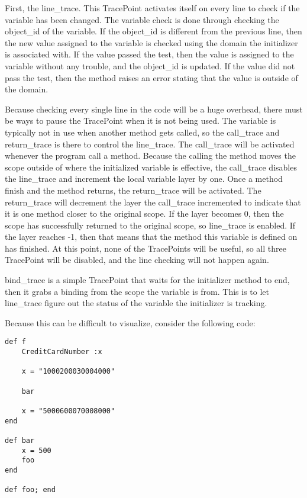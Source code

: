 First, the line\_trace.  This TracePoint activates itself on every line to check if the variable has been changed.  The variable check is done through checking the object\_id of the variable.  If the object\_id is different from the previous line, then the new value assigned to the variable is checked using the domain the initializer is associated with.  If the value passed the test, then the value is assigned to the variable without any trouble, and the object\_id is updated.  If the value did not pass the test, then the method raises an error stating that the value is outside of the domain.

Because checking every single line in the code will be a huge overhead, there must be ways to pause the TracePoint when it is not being used.  The variable is typically not in use when another method gets called, so the call\_trace and return\_trace is there to control the line\_trace.  The call\_trace will be activated whenever the program call a method.  Because the calling the method moves the scope outside of where the initialized variable is effective, the call\_trace disables the line\_trace and increment the local variable layer by one.  Once a method finish and the method returns, the return\_trace will be activated.  The return\_trace will decrement the layer the call\_trace incremented to indicate that it is one method closer to the original scope.  If the layer becomes 0, then the scope has successfully returned to the original scope, so line\_trace is enabled.  If the layer reaches -1, then that means that the method this variable is defined on has finished.  At this point, none of the TracePoints will be useful, so all three TracePoint will be disabled, and the line checking will not happen again.

bind\_trace is a simple TracePoint that waits for the initializer method to end, then it grabs a binding from the scope the variable is from.  This is to let line\_trace figure out the status of the variable the initializer is tracking.

Because this can be difficult to visualize, consider the following code:

\begin{lstlisting}[caption={Declaration of domain: demo}]
def f
    CreditCardNumber :x

    x = "1000200030004000"

    bar

    x = "5000600070008000"
end

def bar
    x = 500
    foo
end

def foo; end
\end{lstlisting}

